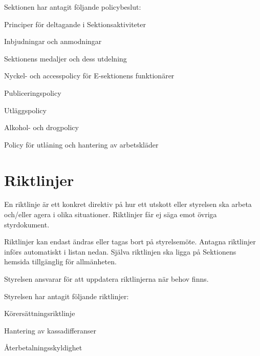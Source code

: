 \documentclass[10pt]{article}
\begin{document}
Sektionen har antagit följande policybeslut:
\begin{dashlist}
    \item Principer för deltagande i Sektionsaktiviteter
    \item Inbjudningar och anmodningar
    \item Sektionens medaljer och dess utdelning
    \item Nyckel- och accesspolicy för E-sektionens funktionärer
    \item Publiceringspolicy
    \item Utläggspolicy
    \item Alkohol- och drogpolicy
    \item Policy för utlåning och hantering av arbetskläder
\end{dashlist}

\section{Riktlinjer}
En riktlinje är ett konkret direktiv på hur ett utskott eller styrelsen ska arbeta och/eller agera i olika situationer. Riktlinjer får ej säga emot övriga styrdokument.

Riktlinjer kan endast ändras eller tagas bort på styrelsemöte. Antagna riktlinjer införs automatiskt i listan nedan. Själva riktlinjen ska ligga på Sektionens hemsida tillgänglig för allmänheten.

Styrelsen ansvarar för att uppdatera riktlinjerna när behov finns.

Styrelsen har antagit följande riktlinjer:

\begin{dashlist}
    \item Körersättningsriktlinje
    \item Hantering av kassadifferanser
    \item Återbetalningsskyldighet
\end{dashlist}

\clearpage
\end{document}
